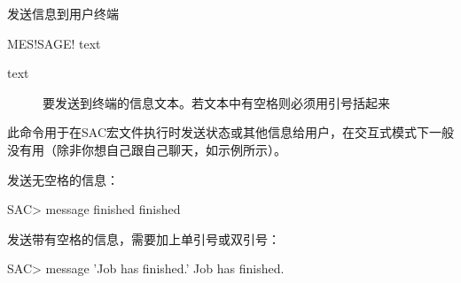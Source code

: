 \label{cmd:message}

发送信息到用户终端

\begin{SACSTX}
MES!SAGE! text
\end{SACSTX}

\begin{description}
\item [text] 要发送到终端的信息文本。若文本中有空格则必须用引号括起来
\end{description}

此命令用于在SAC宏文件执行时发送状态或其他信息给用户，在交互式模式下一般
没有用（除非你想自己跟自己聊天，如示例所示）。

发送无空格的信息：
\begin{SACCode}
SAC> message finished
 finished
\end{SACCode}

发送带有空格的信息，需要加上单引号或双引号：
\begin{SACCode}
SAC> message 'Job has finished.'
 Job has finished.
\end{SACCode}
